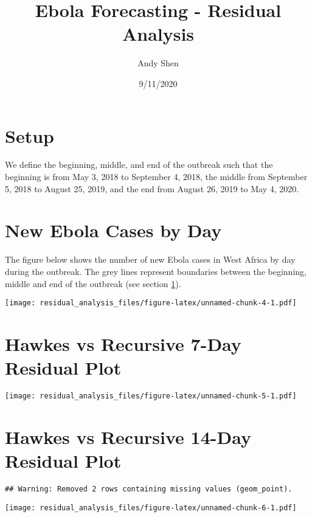 \documentclass[
]{article}
\title{Ebola Forecasting - Residual Analysis}
\author{Andy Shen}
\date{9/11/2020}
\begin{document}
\maketitle

\hypertarget{setup}{%
\section{Setup}\label{setup}}

We define the beginning, middle, and end of the outbreak such that the
beginning is from May 3, 2018 to September 4, 2018, the middle from
September 5, 2018 to August 25, 2019, and the end from August 26, 2019
to May 4, 2020.

\hypertarget{new-ebola-cases-by-day}{%
\section{New Ebola Cases by Day}\label{new-ebola-cases-by-day}}

The figure below shows the number of new Ebola cases in West Africa by
day during the outbreak. The grey lines represent boundaries between the
beginning, middle and end of the outbreak (see section
\protect\hyperlink{setup}{1}).

\texttt{[image: residual\_analysis\_files/figure-latex/unnamed-chunk-4-1.pdf]}

\pagebreak

\hypertarget{hawkes-vs-recursive-7-day-residual-plot}{%
\section{Hawkes vs Recursive 7-Day Residual
Plot}\label{hawkes-vs-recursive-7-day-residual-plot}}

\texttt{[image: residual\_analysis\_files/figure-latex/unnamed-chunk-5-1.pdf]}

\pagebreak

\hypertarget{hawkes-vs-recursive-14-day-residual-plot}{%
\section{Hawkes vs Recursive 14-Day Residual
Plot}\label{hawkes-vs-recursive-14-day-residual-plot}}

\begin{verbatim}
## Warning: Removed 2 rows containing missing values (geom_point).
\end{verbatim}

\texttt{[image: residual\_analysis\_files/figure-latex/unnamed-chunk-6-1.pdf]}
\end{document}
